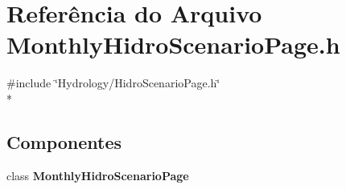 \section{Referência do Arquivo Monthly\+Hidro\+Scenario\+Page.\+h}
\label{_monthly_hidro_scenario_page_8h}
{\ttfamily \#include \char`\"{}Hydrology/\+Hidro\+Scenario\+Page.\+h\char`\"{}}\\*
\subsection*{Componentes}
\begin{DoxyCompactItemize}
\item 
class {\bf Monthly\+Hidro\+Scenario\+Page}
\end{DoxyCompactItemize}
